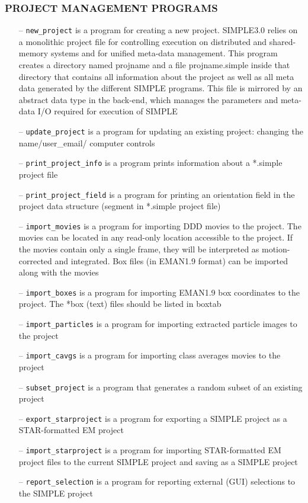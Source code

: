 \documentclass[a4paper,11pt]{article}
\newcommand{\prgname}[1]{\textcolor{NavyBlue}{\texttt{#1}}}
\begin{document}
\subsubsection{PROJECT MANAGEMENT PROGRAMS}
\begin{itemize}
\item[--] \prgname{new\_project} is a program for creating a new project. SIMPLE3.0 relies on a monolithic project file for controlling execution on distributed and shared-memory systems and for unified meta-data management. This program creates a directory named projname and a file projname.simple inside that directory that contains all information about the project as well as all meta data generated by the different SIMPLE programs. This file is mirrored by an abstract data type in the back-end, which manages the parameters and meta-data I/O required for execution of SIMPLE
\item[--] \prgname{update\_project} is a program for updating an existing project: changing the name/user\_email/ computer controls
\item[--] \prgname{print\_project\_info} is a program prints information about a *.simple project file
\item[--] \prgname{print\_project\_field} is a program for printing an orientation field in the project data structure (segment in *.simple project file)
\item[--] \prgname{import\_movies} is a program for importing DDD movies to the project. The movies can be located in any read-only location accessible to the project. If the movies contain only a single frame, they will be interpreted as motion-corrected and integrated. Box files (in EMAN1.9 format) can be imported along with the movies
\item[--] \prgname{import\_boxes} is a program for importing EMAN1.9 box coordinates to the project. The *box (text) files should be listed in boxtab
\item[--] \prgname{import\_particles} is a program for importing extracted particle images to the project
\item[--] \prgname{import\_cavgs} is a program for importing class averages movies to the project
\item[--] \prgname{subset\_project} is a program that generates a random subset of an existing project
\item[--] \prgname{export\_starproject} is a program for exporting a SIMPLE project as a STAR-formatted EM project
\item[--] \prgname{import\_starproject} is a program for importing STAR-formatted EM project files to the current SIMPLE project and saving as a SIMPLE project
\item[--] \prgname{report\_selection} is a program for reporting external (GUI) selections to the SIMPLE project
\end{itemize}
\end{document}
